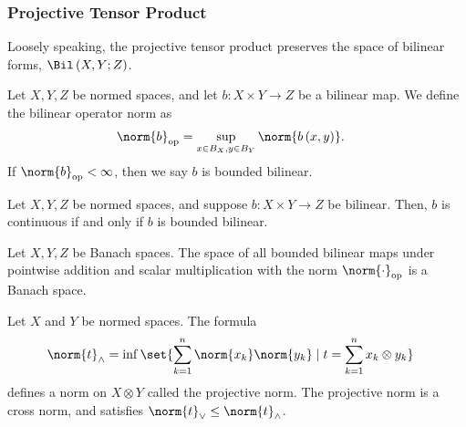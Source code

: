 \documentclass[10pt]{mypackage}
\begin{document}
\subsubsection{Projective Tensor Product}%
Loosely speaking, the projective tensor product preserves the space of bilinear forms, $\Bil\left(X,Y;Z\right)$.
\begin{definition}
  Let $X,Y,Z$ be normed spaces, and let $b: X\times Y\rightarrow Z$ be a bilinear map. We define the bilinear operator norm as
  \begin{align*}
    \norm{b}_{\text{op}} &= \sup_{x\in B_X,y\in B_Y}\norm{b\left(x,y\right)}.
  \end{align*}
  If $\norm{b}_{\text{op}} < \infty$, then we say $b$ is bounded bilinear.
\end{definition}
\begin{proposition}
  Let $X,Y,Z$ be normed spaces, and suppose $b: X\times Y\rightarrow Z$ be bilinear. Then, $b$ is continuous if and only if $b$ is bounded bilinear.
\end{proposition}
\begin{proposition}
  Let $X,Y,Z$ be Banach spaces. The space of all bounded bilinear maps under pointwise addition and scalar multiplication with the norm $\norm{\cdot}_{\text{op}}$ is a Banach space.
\end{proposition}
\begin{proposition}
  Let $X$ and $Y$ be normed spaces. The formula
  \begin{align*}
    \norm{t}_{\wedge} &= \inf\set{\sum_{k=1}^{n}\norm{x_k}\norm{y_k}\mid t = \sum_{k=1}^{n}x_k\otimes y_k}
  \end{align*}
  defines a norm on $X\otimes Y$ called the projective norm. The projective norm is a cross norm, and satisfies $\norm{t}_{\vee}\leq \norm{t}_{\wedge}$.
\end{proposition}
\end{document}
